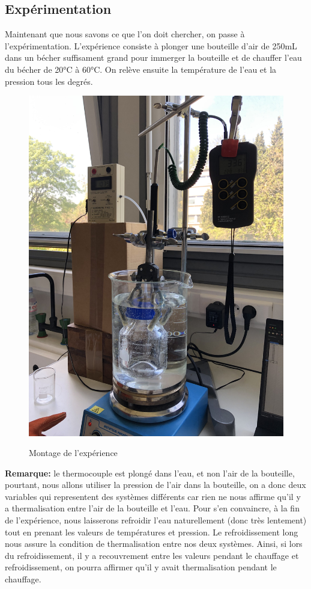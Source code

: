\documentclass[12pt]{article}
\begin{document}
\subsection{Expérimentation}
Maintenant que nous savons ce que l'on doit chercher, on passe à l'expérimentation. L'expérience consiste à
plonger une bouteille d'air de 250mL dans un bécher suffisament grand pour immerger la bouteille et de chauffer l'eau du bécher de 20°C à 60°C.
On relève ensuite la température de l'eau et la pression tous les degrés.

\begin{figure}[!h]
	\begin{center}
		\includegraphics[scale=0.05]{img/exp2.jpg}
		\label{Exp2}
		\caption{Montage de l'expérience}
	\end{center}
\end{figure}

\textbf{Remarque:} le thermocouple est plongé dans l'eau, et non l'air de la bouteille, pourtant, nous allons utiliser la pression de l'air dans
la bouteille, on a donc deux variables qui representent des systèmes différents car rien ne nous affirme qu'il y a thermalisation entre l'air de la bouteille et l'eau.
Pour s'en convaincre, à la fin de l'expérience, nous laisserons refroidir l'eau naturellement (donc très lentement) tout en prenant les valeurs de températures et pression. 
Le refroidissement long nous assure la condition de thermalisation entre nos deux systèmes. Ainsi, si lors du refroidissement, il y a recouvrement entre les valeurs pendant le chauffage et 
refroidissement, on pourra affirmer qu'il y avait thermalisation pendant le chauffage.
\end{document}
